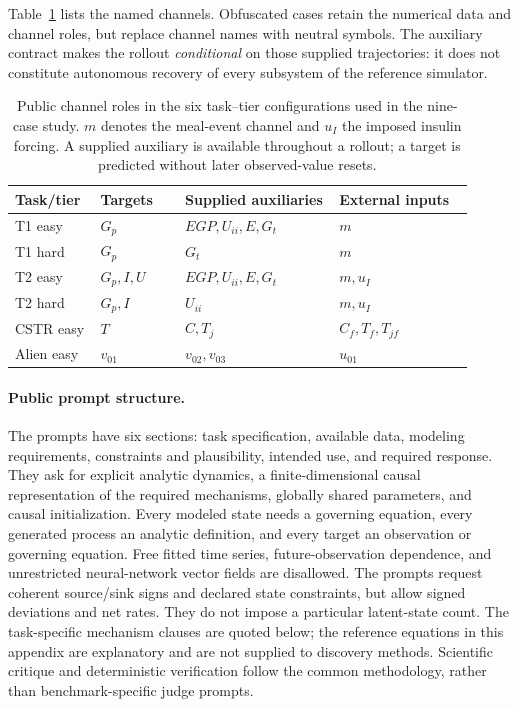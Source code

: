 Table~\ref{tab:benchmark_channels} lists the named channels. Obfuscated cases
retain the numerical data and channel roles, but replace channel names with
neutral symbols. The auxiliary contract makes the rollout \emph{conditional}
on those supplied trajectories: it does not constitute autonomous recovery of
every subsystem of the reference simulator.

\begin{table}[htbp]
\centering
\small
\setlength{\tabcolsep}{4pt}
\caption{Public channel roles in the six task--tier configurations used in the
nine-case study. $m$ denotes the meal-event channel and $u_I$ the imposed insulin
forcing. A supplied auxiliary is available throughout a rollout; a target is
predicted without later observed-value resets.}
\label{tab:benchmark_channels}
\begin{tabular}{@{}p{0.16\linewidth}p{0.17\linewidth}p{0.31\linewidth}p{0.27\linewidth}@{}}
\toprule
Task/tier & Targets & Supplied auxiliaries & External inputs \\
\midrule
T1 easy & $G_p$ & $EGP,U_{ii},E,G_t$ & $m$ \\
T1 hard & $G_p$ & $G_t$ & $m$ \\
T2 easy & $G_p,I,U$ & $EGP,U_{ii},E,G_t$ & $m,u_I$ \\
T2 hard & $G_p,I$ & $U_{ii}$ & $m,u_I$ \\
CSTR easy & $T$ & $C,T_j$ & $C_f,T_f,T_{jf}$ \\
Alien easy & $v_{01}$ & $v_{02},v_{03}$ & $u_{01}$ \\
\bottomrule
\end{tabular}
\end{table}

\paragraph{Public prompt structure.}
The prompts have six sections: task specification, available data, modeling
requirements, constraints and plausibility, intended use, and required response.
They ask for explicit analytic dynamics, a finite-dimensional causal
representation of the required mechanisms, globally shared parameters, and
causal initialization. Every modeled state needs a governing equation, every
generated process an analytic definition, and every target an observation or
governing equation. Free fitted time series, future-observation dependence,
and unrestricted neural-network vector fields are disallowed. The prompts
request coherent source/sink signs and declared state constraints, but allow
signed deviations and net rates. They do not impose a particular latent-state
count. The task-specific mechanism clauses are quoted below; the reference
equations in this appendix are explanatory and are not supplied to discovery
methods. Scientific critique and deterministic verification follow the common
methodology, rather than benchmark-specific judge prompts.

